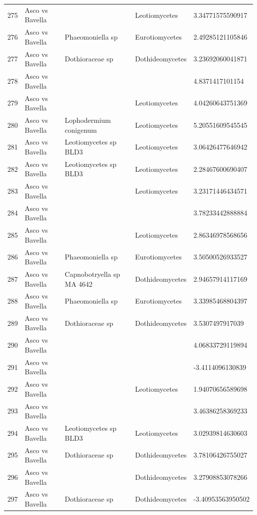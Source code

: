 \documentclass[12pt]{article}\usepackage[]{graphicx}\usepackage[]{color}
\numberwithin{figure}{section}
\begin{document}
\begin{table}[ht]
\begin{tabular}{lllll}
  275 & Asco vs Bavella &  & Leotiomycetes & 3.34771575590917 \\ 
  276 & Asco vs Bavella & Phaeomoniella sp & Eurotiomycetes & 2.49285121105846 \\ 
  277 & Asco vs Bavella & Dothioraceae sp & Dothideomycetes & 3.23692060041871 \\ 
  278 & Asco vs Bavella &  &  & 4.8371417101154 \\ 
  279 & Asco vs Bavella &  & Leotiomycetes & 4.04260643751369 \\ 
  280 & Asco vs Bavella & Lophodermium conigenum & Leotiomycetes & 5.20551609545545 \\ 
  281 & Asco vs Bavella & Leotiomycetes sp BLD3 & Leotiomycetes & 3.06426477646942 \\ 
  282 & Asco vs Bavella & Leotiomycetes sp BLD3 & Leotiomycetes & 2.28467600690407 \\ 
  283 & Asco vs Bavella &  & Leotiomycetes & 3.23171446434571 \\ 
  284 & Asco vs Bavella &  &  & 3.78233442888884 \\ 
  285 & Asco vs Bavella &  & Leotiomycetes & 2.86346978568656 \\ 
  286 & Asco vs Bavella & Phaeomoniella sp & Eurotiomycetes & 3.50500526933527 \\ 
  287 & Asco vs Bavella & Capnobotryella sp MA 4642 & Dothideomycetes & 2.94657914117169 \\ 
  288 & Asco vs Bavella & Phaeomoniella sp & Eurotiomycetes & 3.33985468804397 \\ 
  289 & Asco vs Bavella & Dothioraceae sp & Dothideomycetes & 3.5307497917039 \\ 
  290 & Asco vs Bavella &  &  & 4.06833729119894 \\ 
  291 & Asco vs Bavella &  &  & -3.4114096130839 \\ 
  292 & Asco vs Bavella &  & Leotiomycetes & 1.94070656589698 \\ 
  293 & Asco vs Bavella &  &  & 3.46386258369233 \\ 
  294 & Asco vs Bavella & Leotiomycetes sp BLD3 & Leotiomycetes & 3.02939814630603 \\ 
  295 & Asco vs Bavella & Dothioraceae sp & Dothideomycetes & 3.78106426755027 \\ 
  296 & Asco vs Bavella &  & Dothideomycetes & 3.27908853078266 \\ 
  297 & Asco vs Bavella & Dothioraceae sp & Dothideomycetes & -3.40953563950502 \\ 

\end{tabular}
\end{table}
\end{document}
